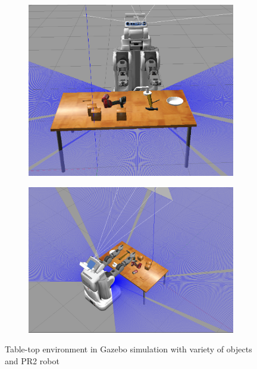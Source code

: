 \begin{figure}

    \begin{subfigure}{0.49\textwidth}
      \includegraphics[width=\linewidth]{figures/GazeboEnv1.png}
      \caption{} \label{fig:1a}
    \end{subfigure}%
    \hspace*{\fill}   %
    \begin{subfigure}{0.49\textwidth}
      \includegraphics[width=\linewidth]{figures/GazeboEnv2.png}
      \caption{} \label{fig:1b}
    \end{subfigure}%

\caption{Table-top environment in Gazebo simulation with variety of objects and PR2 robot \label{fig:GazeboPR2}}
\end{figure}